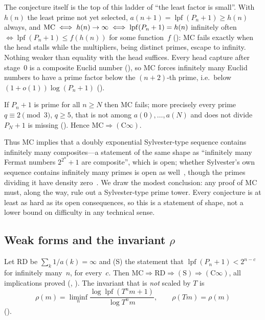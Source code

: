 \documentclass[10pt,a4paper]{article}
\newcommand{\lpf}{\operatorname{lpf}}
\newcommand{\RD}{\mathrm{RD}}
\newcommand{\Cinf}{(\mathrm{C}\infty)}
\begin{document}
The conjecture itself is the top of this ladder of ``the least factor is
small''.  With $h(n)$ the least prime not yet selected, $a(n{+}1) =
\lpf(P_n+1) \ge h(n)$ always, and
$\MC \iff h(n)\to\infty \iff \lpf(P_n+1) = h(n)$ infinitely often
$\iff \lpf(P_n+1) \le f(h(n))$ for some function~$f$
(): MC
fails exactly when the head stalls while the multipliers, being distinct
primes, escape to infinity.  Nothing weaker than equality with the head
suffices.  Every head capture after stage~$0$ is a composite Euclid number
(), so MC forces
infinitely many Euclid numbers to have a prime factor below the $(n{+}2)$-th
prime, i.e.\ below $(1+o(1))\log(P_n+1)$
().

\begin{theorem}
If $P_n+1$ is prime for all $n\ge N$ then MC fails; more precisely every
prime $q\equiv2\pmod3$, $q\ge5$, that is not among $a(0),\dots,a(N)$ and
does not divide $P_N+1$ is missing
().
Hence $\mathrm{MC}\Rightarrow\Cinf$.
\end{theorem}

Thus MC implies that a doubly exponential Sylvester-type sequence
contains infinitely many composites---a statement of the same shape as
``infinitely many Fermat numbers $2^{2^n}+1$ are composite'', which is
open; whether Sylvester's own sequence contains infinitely many primes is
open as well~\cite{Vardi1991}, though the primes dividing it have density
zero~\cite{Odoni1985}.  We draw the modest conclusion: any proof of MC
must, along the way, rule out a Sylvester-type prime tower.  Every
conjecture is at least as hard as its open consequences, so this is a
statement of shape, not a lower bound on difficulty in any technical
sense.

\subsection{Weak forms and the invariant $\rho$}

Let RD be $\sum_k1/a(k)=\infty$ and (S) the statement that
$\lpf(P_n+1)<2^{n-c}$ for infinitely many~$n$, for every~$c$.  Then
$\mathrm{MC}\Rightarrow\RD\Rightarrow(\mathrm S)\Rightarrow\Cinf$, all
implications proved
(,
).
The invariant that is \emph{not} scaled by $T$ is
\[
  \rho(m)=\liminf_{n}\frac{\log\lpf(T^{n}m+1)}{\log T^{n}m},
  \qquad \rho(Tm)=\rho(m)
\]
().
\end{document}
